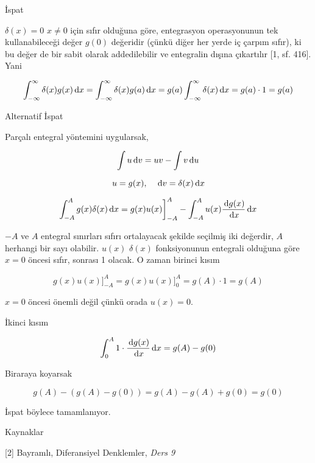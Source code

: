 \documentclass[12pt,fleqn]{article}\usepackage{../../common}
\begin{document}
İspat

$\delta(x)=0$ $x \ne 0$ için sıfır olduğuna göre, entegrasyon operasyonunun
tek kullanabileceği değer $g(0)$ değeridir (çünkü diğer her yerde iç çarpım
sıfır), ki bu değer de bir sabit olarak addedilebilir ve entegralin dışına
çıkartılır [1, sf. 416]. Yani

$$
\int_{-\infty}^{\infty} \delta(x)g(x) \,\mathrm{d} x = 
\int_{-\infty}^{\infty} \delta(x)g(a) \,\mathrm{d} x = 
g(a) \int_{-\infty}^{\infty} \delta(x) \,\mathrm{d} x = 
g(a) \cdot 1 = g(a)
$$


Alternatif İspat

Parçalı entegral yöntemini uygularsak,

$$ \int u \,\mathrm{d} v = uv - \int v \,\mathrm{d} u $$

$$ u = g(x), \quad \,\mathrm{d} v = \delta(x) \,\mathrm{d} x $$

$$
\int_{-A}^{A} g(x)\delta(x) \,\mathrm{d} x = g(x)u(x) \bigg]_{-A}^{A} -
\int_{-A}^{A} u(x) \frac{\,\mathrm{d} g(x)}{\,\mathrm{d} x}\,\mathrm{d} x
$$

$-A$ ve $A$ entegral sınırları sıfırı ortalayacak şekilde seçilmiş iki
değerdir, $A$ herhangi bir sayı olabilir. $u(x)$ $\delta(x)$ fonksiyonunun
entegrali olduğuna göre $x=0$ öncesi sıfır, sonrası 1 olacak. O zaman
birinci kısım

$$ g(x)u(x) \bigg]_{-A}^{A} = g(x)u(x) \bigg]_{0}^{A} = g(A)\cdot 1 = g(A)$$

$x=0$ öncesi önemli değil çünkü orada $u(x) = 0$. 

İkinci kısım

$$ \int_0^A 1\cdot \frac{\,\mathrm{d} g(x)}{\,\mathrm{d} x}\,\mathrm{d} x = g(A) - g(0) $$

Biraraya koyarsak

$$  g(A) - (g(A) - g(0)) = g(A) - g(A) + g(0) = g(0) $$

İspat böylece tamamlanıyor.

Kaynaklar 

[2] Bayramlı, Diferansiyel Denklemler, {\em Ders 9}
\end{document}
